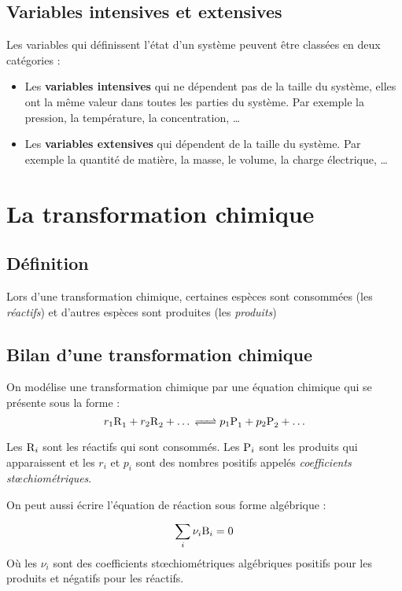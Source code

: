 \documentclass[MPSI]{cours}
\begin{document}
\subsection{Variables intensives et extensives}%
\label{sub:variables_intensives_et_extensives}

Les variables qui définissent l'état d'un système peuvent être classées en deux catégories : 
\begin{itemize}
  \item Les \textbf{variables intensives} qui ne dépendent pas de la taille du système, elles ont la même valeur dans toutes les parties du système. Par exemple la pression, la température, la concentration, \ldots

  \item Les \textbf{variables extensives} qui dépendent de la taille du système. Par exemple la quantité de matière, la masse, le volume, la charge électrique, \ldots
\end{itemize}

\section{La transformation chimique}%
\label{ub:la_transformation_chimique}

\subsection{Définition}%
\label{sub:definition}

Lors d'une transformation chimique, certaines espèces sont consommées (les \emph{réactifs}) et d'autres espèces sont produites (les \emph{produits})

\subsection{Bilan d'une transformation chimique}%
\label{sub:bilan_d_une_transformation_chimique}
On modélise une transformation chimique par une équation chimique qui se présente sous la forme :
\begin{equation*}
  r_1\ce{R_1} + r_2\ce{R_2} + \ldots \ce{<=>} p_1\ce{P_1} + p_2\ce{P_2} + \ldots
\end{equation*}

Les $\ce{R}_i$ sont les réactifs qui sont consommés. Les $\ce{P}_i$ sont les produits qui apparaissent et les $r_i$ et $p_i$ sont des nombres positifs appelés \emph{coefficients st\oe{}chiométriques}.

On peut aussi écrire l'équation de réaction sous forme algébrique : 
\begin{equation*}
  \sum^{}_{i} \nu_i\ce{B}_i =0  
\end{equation*}
Où les $\nu_i$ sont des coefficients st\oe{}chiométriques algébriques positifs pour les produits et négatifs pour les réactifs. 
\end{document}
